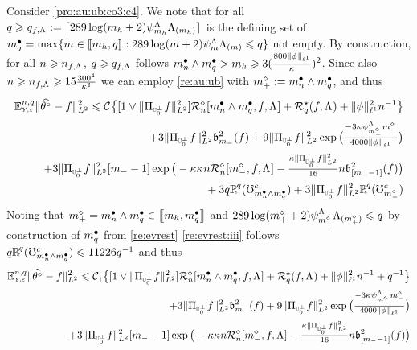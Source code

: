 \begin{pro}
Consider \ref{pro:au:ub:co3:c4}. We note that for all $\ssE\geq \ssE_{\xdf,\iSv}:=\ceil{289\log(\Di_{\ydf}+2)\cmiSv[\Di_{\ydf}]\miSv[\Di_{\ydf}]}$
is the defining set of
$\sDi{\ssE}=\max\{\Di\in\nset{\Di_{\ydf},\ssE}:289\log(\Di+2)\cmiSv[\Di]\miSv[\Di]\leq\ssE\}$
not empty.  By construction, for all $\ssY\geq\ssY_{\xdf,\iSv}$, $\ssE\geq\ssE_{\xdf,\iSv}$
follows $\sDi{\ssY}\wedge\sDi{\ssE}> \Di_{\ydf} \geq
3(\tfrac{800\Vnormlp[1]{\fydf}}{\cpen})^2$. Since also $\ssY\geq\ssY_{\xdf,\iSv}\geq 15\tfrac{300^4}{\cpen^2}$ 
we can employ \cref{re:au:ub} with $\pdDi:=\sDi{\ssY}\wedge\sDi{\ssE}$, and thus 
\begin{multline*}
\FuEx[\ssY,\ssE]{\rY,\rE}\VnormLp{\hxdfPr[]-\xdf}^2\leq\cst{}\big\{[1\vee\VnormLp{\Proj[{\mHiH[0]^\perp}]\xdf}^2]\hRaDi{\sDi{\ssY}\wedge\sDi{\ssE},\xdf,\iSv}+\mRa{\xdf,\iSv}+\Vnormlp[1]{\fydf}^2\ssY^{-1}\big\}
\\
\hfill+3\VnormLp{\Proj[{\mHiH[0]^\perp}]\xdf}^2\bias[\mDi]^2(\xdf)+9
\VnormLp{\Proj[{\mHiH[0]^\perp}]\xdf}^2\exp\big(\tfrac{-3\cpen\cmiSv[\mdDi]\mdDi}{4000\Vnormlp[1]{\fydf}}\big)
\\\hfill
+3
\VnormLp{\Proj[{\mHiH[0]^\perp}]\xdf}^2[\mDi-1]\exp\big(-\rWc\cpen\ssY\hRaDi{\mdDi,\xdf,\iSv}-
\tfrac{\rWc\VnormLp{\Proj[{\mHiH[0]^\perp}]\xdf}^2}{16}\ssY\bias[{[\mDi-1]}]^2(\xdf)\big)\\\null\hfill
+3\ssE\FuVg[\ssE]{\rE}(\aixEv[\sDi{\ssY}\wedge\sDi{\ssE}]^c)+3
\VnormLp{\Proj[{\mHiH[0]^\perp}]\xdf}^2\FuVg[\ssE]{\rE}(\aixEv[\mdDi]^c)
  \end{multline*}
Noting that
$\pdDi=\sDi{\ssY}\wedge\sDi{\ssE}\in\nset{\Di_{\ydf},\sDi{\ssE}}$ and
$289\log(\pdDi+2)\cmiSv[\pdDi]\miSv[\pdDi]\leq\ssE$ by construction of
$\sDi{\ssE}$ from \cref{re:evrest} \ref{re:evrest:iii} follows
$\ssE\FuVg[\ssE]{\rE}(\aixEv[\sDi{\ssY}\wedge\sDi{\ssE}]^c)\leq
11226\ssE^{-1}$ and thus
\begin{multline*}
\FuEx[\ssY,\ssE]{\rY,\rE}\VnormLp{\hxdfPr[]-\xdf}^2\leq\cst{1}\big\{[1\vee\VnormLp{\Proj[{\mHiH[0]^\perp}]\xdf}^2]\hRaDi{\sDi{\ssY}\wedge\sDi{\ssE},\xdf,\iSv}+\mRa{\xdf,\iSv}+\Vnormlp[1]{\fydf}^2\ssY^{-1}+\ssE^{-1}\big\}
\\
\hfill+3\VnormLp{\Proj[{\mHiH[0]^\perp}]\xdf}^2\bias[\mDi]^2(\xdf)+9
\VnormLp{\Proj[{\mHiH[0]^\perp}]\xdf}^2\exp\big(\tfrac{-3\cpen\cmiSv[\mdDi]\mdDi}{4000\Vnormlp[1]{\fydf}}\big)
\\\hfill
+3
\VnormLp{\Proj[{\mHiH[0]^\perp}]\xdf}^2[\mDi-1]\exp\big(-\rWc\cpen\ssY\hRaDi{\mdDi,\xdf,\iSv}-
\tfrac{\rWc\VnormLp{\Proj[{\mHiH[0]^\perp}]\xdf}^2}{16}\ssY\bias[{[\mDi-1]}]^2(\xdf)\big)\\\null\hfill

\end{multline*}
\end{pro}
